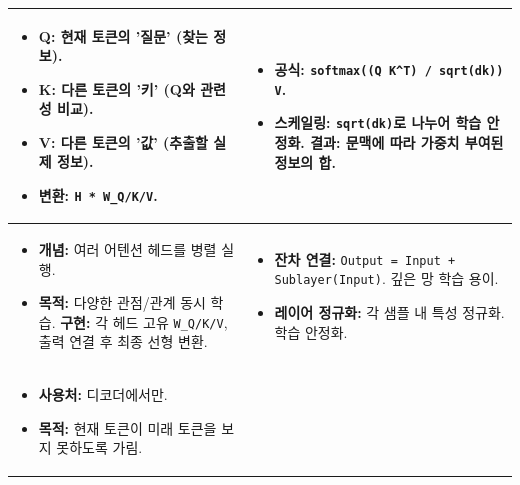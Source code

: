 \documentclass[11pt,a4paper]{article}
\theoremstyle{definition}
\begin{document}
\begin{adjustbox}{width=\textwidth,center}
\begin{tabular}{p{}p{}}
\midrule
\begin{tcolorbox}[mybox, title={Q, K, V (Query, Key, Value)}]
\begin{itemize}
    \item \textbf{Q:} 현재 토큰의 '질문' (찾는 정보).
    \item \textbf{K:} 다른 토큰의 '키' (Q와 관련성 비교).
    \item \textbf{V:} 다른 토큰의 '값' (추출할 실제 정보).
    \item \textbf{변환:} \texttt{H * W_Q/K/V}.
\end{itemize}
\end{tcolorbox}
&
\begin{tcolorbox}[mybox, title={스케일드 닷-프로덕트 어텐션}]
\begin{itemize}
    \item \textbf{공식:} \texttt{softmax((Q K^T) / sqrt(dk)) V}.
    \item \textbf{스케일링:} \texttt{sqrt(dk)}로 나누어 학습 안정화.
    \textbf{결과:} 문맥에 따라 가중치 부여된 정보의 합.
\end{itemize}
\end{tcolorbox} \\
\midrule
\begin{tcolorbox}[mybox, title={멀티 헤드 어텐션}]
\begin{itemize}
    \item \textbf{개념:} 여러 어텐션 헤드를 병렬 실행.
    \item \textbf{목적:} 다양한 관점/관계 동시 학습.
    \textbf{구현:} 각 헤드 고유 \texttt{W_Q/K/V}, 출력 연결 후 최종 선형 변환.
\end{itemize}
\end{tcolorbox}
&
\begin{tcolorbox}[mybox, title={잔차 연결 및 정규화}]
\begin{itemize}
    \item \textbf{잔차 연결:} \texttt{Output = Input + Sublayer(Input)}. 깊은 망 학습 용이.
    \item \textbf{레이어 정규화:} 각 샘플 내 특성 정규화. 학습 안정화.
\end{itemize}
\end{tcolorbox} \\
\midrule
\begin{tcolorbox}[mybox, title={마스크드 어텐션}]
\begin{itemize}
    \item \textbf{사용처:} 디코더에서만.
    \item \textbf{목적:} 현재 토큰이 미래 토큰을 보지 못하도록 가림.

\end{itemize}
\end{tcolorbox}
\end{tabular}
\end{adjustbox}
\end{document}
